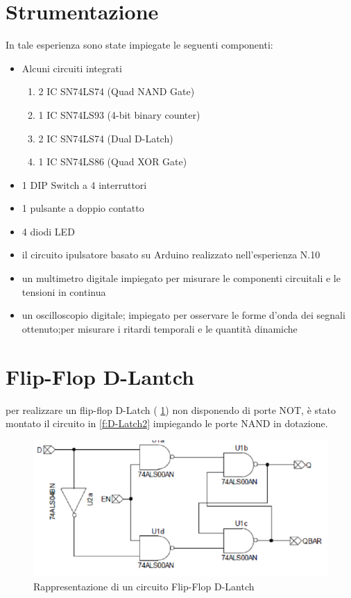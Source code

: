 \section{Strumentazione}
	In tale esperienza sono state impiegate le seguenti componenti:\begin{itemize}
		\item Alcuni circuiti integrati \begin{enumerate}
			\item 2 IC SN74LS74 (Quad NAND Gate)
			\item 1 IC SN74LS93 (4-bit binary counter)
			\item 2 IC SN74LS74 (Dual D-Latch)
			\item 1 IC SN74LS86 (Quad XOR Gate)
		\end{enumerate}
		\item 1 DIP Switch a 4 interruttori
		\item 1 pulsante a doppio contatto
		\item 4 diodi LED
		\item il circuito ipulsatore basato su Arduino realizzato nell'esperienza N.10
		\item un multimetro digitale impiegato per misurare le componenti circuitali e le tensioni in continua
		\item un oscilloscopio digitale; impiegato per osservare le forme d'onda dei segnali ottenuto;per misurare i ritardi temporali e le quantità dinamiche
	\end{itemize}
\section{Flip-Flop D-Lantch}
	per realizzare un flip-flop D-Latch (\figurename{ \ref{f:D-Latch1}}) non disponendo di porte NOT, è stato montato il circuito in \figurename{ \ref{f:D-Latch2}} impiegando le
	porte NAND in dotazione.
	\begin{figure}[hb]
		\centering
		\includegraphics[scale=0.75]{../Figs-Tabs/D-Latch1.png}
		\caption{Rappresentazione di un circuito Flip-Flop D-Lantch}
			\label{f:D-Latch1}
	\end{figure}

